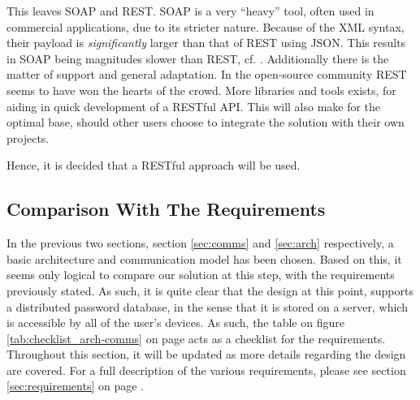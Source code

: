 			This leaves SOAP and REST. SOAP is a very ``heavy'' tool, often used in commercial applications, due to its stricter nature. Because of the XML syntax, their payload is \emph{significantly} larger than that of REST using JSON. This results in SOAP being magnitudes slower than REST, cf. \cite{soap_vs_rest}. Additionally there is the matter of support and general adaptation. In the open-source community REST seems to have won the hearts of the crowd. More libraries and tools exists, for aiding in quick development of a RESTful API. This will also make for the optimal base, should other users choose to integrate the solution with their own projects.

			Hence, it is decided that a RESTful approach will be used. 

		\subsection{Comparison With The Requirements}
			In the previous two sections, section \ref{sec:comms} and \ref{sec:arch} respectively, a basic architecture and communication model has been chosen. Based on this, it seems only logical to compare our solution at this step, with the requirements previously stated. As such, it is quite clear that the design at this point, supports a distributed password database, in the sense that it is stored on a server, which is accessible by all of the user's devices. As such, the table on figure \ref{tab:checklist_arch-comms} on page \pageref{tab:checklist_arch-comms} acts as a checklist for the requirements. Throughout this section, it will be updated as more details regarding the design are covered. For a full description of the various requirements, please see section \ref{sec:requirements} on page \pageref{sec:requirements}.


